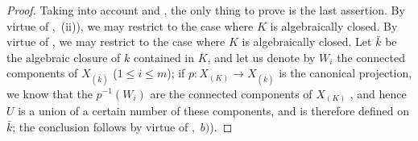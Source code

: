 \begin{proof}
Taking into account  and , the only thing to prove is the last assertion.
By virtue of ,~(ii)), we may restrict to the case where $K$ is algebraically closed.
By virtue of , we may restrict to the case where $K$ is algebraically closed.
Let $\bar{k}$ be the algebraic closure of $k$ contained in $K$, and let us denote by $W_i$ the connected components
of $X_{(\bar{k})}$ ($1\leq i\leq m$); if $p:X_{(K)}\to X_{(\bar{k})}$ is the canonical projection, we know that the $p^{-1}(W_i)$ are the connected components of $X_{(K)}$ , and hence $U$ is a union of a certain number of these components, and is therefore defined on $\bar{k}$; the conclusion follows by virtue of ,~$b)$).
\end{proof}
